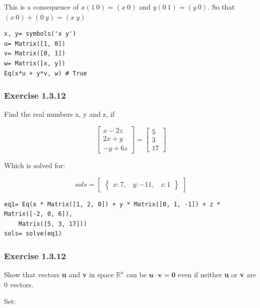 \documentclass[a4paper]{article}
\begin{document}
This is a consequence of $x(1\ 0) = (x\ 0)$ and $y(0\ 1) = (y\ 0)$. So that
$(x\ 0) + (0\ y) = (x\ y)$

\begin{verbatim}
x, y= symbols('x y')
u= Matrix([1, 0])
v= Matrix([0, 1])
w= Matrix([x, y])
Eq(x*u + y*v, w) # True
\end{verbatim}

\subsubsection{Exercise 1.3.12}

Find the real numbers x, y and z, if

\begin{equation}\label{eq:na}
\left[\begin{matrix}x - 2 z\\2 x + y\\- y + 6 z\end{matrix}\right] = \left[\begin{matrix}5\\3\\17\end{matrix}\right]
\end{equation}

Which is solved for:

\begin{equation}\label{eq:}
sols= \begin{bmatrix}\begin{Bmatrix}x : 7, & y : -11, & z : 1\end{Bmatrix}\end{bmatrix}
\end{equation}

\begin{verbatim}
eq1= Eq(x * Matrix([1, 2, 0]) + y * Matrix([0, 1, -1]) + z * Matrix([-2, 0, 6]),
    Matrix([5, 3, 17]))
sols= solve(eq1)
\end{verbatim}

\subsubsection{Exercise 1.3.12}

Show that vectors \textbf{u} and \textbf{v} in space $\mathbb{R}^n$ can be
$\mathbf{u} \cdot{} \mathbf{v} = \mathbf{0}$ even if neither \textbf{u} or \textbf{v}
are 0 vectors.

Set:
\end{document}
